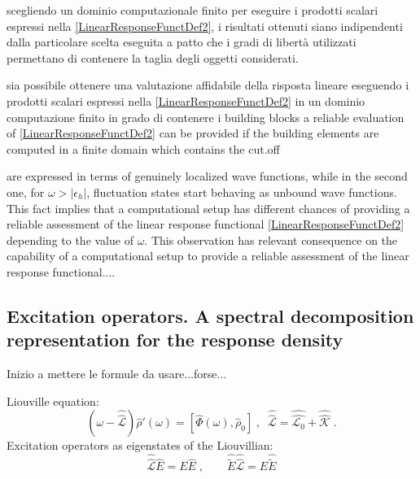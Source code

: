 \documentclass[reprint,aps,prb]{revtex4-1}
\newcommand{\dd}{{\rm d}}
\renewcommand{\r}{{\bf r}}
\newcommand{\eps}{\epsilon}
\newcommand{\be}{\begin{equation}}
\newcommand{\ee}{\end{equation}}
\newcommand{\qq}{\qquad}
\newcommand{\lb}{\label}
\newcommand{\op}[1]{\hat {#1}}
\newcommand{\sop}[1]{\op{\op {#1}}}
\newcommand{\commutator}[2]{\left[ {#1} , {#2} \right]}
\newcommand{\trace}[1]{\mathrm{tr}\left(#1\right)}
\newcommand{\dmnot}{\op{\rho}_0}
\newcommand{\dm}{\op{\rho}}
\newcommand{\hnot}{\op{H}_0}
\newcommand{\Liouv}{\sop{\mathcal L}}
\newcommand{\Liouvnot}{\sop{\mathcal L_0}}
\newcommand{\coupl}{\sop{\mathcal K}}
\begin{document}
scegliendo un dominio computazionale
finito per eseguire i prodotti scalari espressi nella \eqref{LinearResponseFunctDef2}, i risultati ottenuti siano indipendenti dalla particolare scelta eseguita a patto che i gradi di libertà
utilizzati permettano di contenere la taglia degli oggetti considerati.


sia possibile ottenere una valutazione
affidabile della risposta lineare eseguendo i prodotti scalari espressi nella \eqref{LinearResponseFunctDef2}  in un dominio computazione finito in grado di contenere i building blocks a reliable evaluation
of \eqref{LinearResponseFunctDef2} can be provided if the building elements are computed in a finite domain which contains the cut.off

\vspace{1cm}
are expressed in terms of genuinely localized wave functions, while in the second one, for $\omega>|\eps_h|$, fluctuation states start behaving as unbound wave functions. 
This fact implies that a computational setup has different chances of providing a reliable assessment of the linear response functional \eqref{LinearResponseFunctDef2} depending
to the value of $\omega$. 
This observation has relevant consequence on the capability of a computational setup to provide a reliable assessment of the linear response functional....  



\vspace{0.3cm}


\subsection{Excitation operators. A spectral decomposition representation for the response density}

Inizio a mettere le formule da usare...forse...

Liouville equation:
\be\lb{LiouvillianRhopomegaDef1}
\left(\omega - \Liouv\right) \dm'(\omega) =  \commutator{\op\Phi(\omega)}{\dmnot}\;,\;\; 
\Liouv = \Liouvnot + \coupl \;.
\ee
Excitation operators as eigenstates of the Liouvillian:
\be
\Liouv \op E = E \op E \;, \qq
 \op{\tilde E} \Liouv = E \op{\tilde E}
\ee
\end{document}
